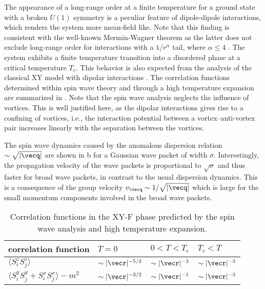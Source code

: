 The appearance of a long-range order at a finite temperature for a ground state with a broken $U(1)$ symmetry is a peculiar feature of dipole-dipole interactions, which renders the system more mean-field like.
Note that this finding is consistent with the well-known Mermin-Wagner theorem as the latter does not exclude long-range order for interactions with a $1/r^\alpha$ tail, where $\alpha \le 4$ \cite{Mermin1966,DeSousa2005}.
The system exhibits a finite temperature transition into a disordered phase at a critical temperature $T_{c}$.
This behavior is also expected from the analysis of the classical XY model with dipolar interactions \cite{Bruno2001}.
The correlation functions determined within spin wave theory and through a high temperature expansion are summarized in .
Note that the spin wave analysis neglects the influence of vortices.
This is well justified here, as the dipolar interactions gives rise to a confining of vortices, i.e., the interaction potential between a vortex--anti-vortex pair increases linearly with the separation between the vortices.

The spin wave dynamics caused by the anomalous dispersion relation $\sim \sqrt{|{\vecq}|}$ are shown in b for a Gaussian wave packet of width $\sigma$. Interestingly, the propagation velocity of the wave packets is proportional to $\sqrt{\sigma}$ and thus faster for broad wave packets, in contrast to the usual dispersion dynamics. This is a consequence of the group velocity $v_{\vecq} \sim 1/\sqrt{|{\vecq}|}$ which is large for the small momentum components involved in the broad wave packets.

\begin{table}
    \centering
    \begin{tabu} to .8\textwidth {X[1.8]X[c]X[c]X[c]}
        \toprule
        correlation function & $T=0$ & $0 < T < T_{c}$ & $T_{c}< T$ \\
        \midrule
        $ \langle S^{z}_{i} S^{z}_{j}\rangle$  &$ \sim |{\vecr}|^{-5/2}$  & $\sim |{\vecr}|^{-3}$ &  $\sim |{\vecr}|^{-3}$ \\
        $ \langle S^{y}_{i} S^{y}_{j}+ S^{x}_{i} S^{x}_{j}\rangle- m^2$  &$ \sim |{\vecr}|^{-3/2}$ &  $\sim |{\vecr}|^{-1}$ &  $\sim |{\vecr}|^{-3}$ \\
        \bottomrule
    \end{tabu}
    \caption{Correlation functions in the XY-F phase predicted by the spin wave analysis and high temperature expansion.}
\end{table}


